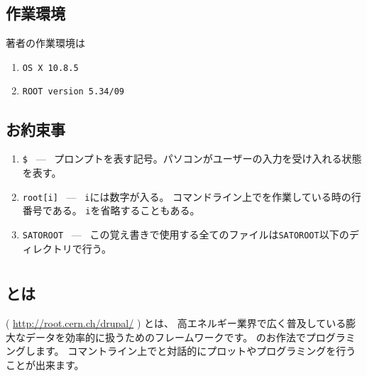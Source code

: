 \documentclass{jarticle}
\begin{document}
  \subsection{作業環境}
  著者の作業環境は
  \begin{enumerate}
   \item 
	 \verb|OS X 10.8.5|
   \item 
	 \verb|ROOT version 5.34/09|
  \end{enumerate}


  \subsection{お約束事}
  \begin{enumerate}
   \item \verb|$| \ --- \ プロンプトを表す記号。パソコンがユーザーの入力を受け入れる状態を表す。
   \item \verb|root[i]| \ --- \ \verb|i|には数字が入る。
	 コマンドライン上で\ROOT を作業している時の行番号である。
	 \verb|i|を省略することもある。
   \item \verb|SATOROOT| \ --- \ この覚え書きで使用する全てのファイルは\verb|SATOROOT|以下のディレクトリで行う。
  \end{enumerate}

  \clearpage
 \section{\ROOT}


  \subsection{\ROOT とは}
  \ROOT ( \url{http://root.cern.ch/drupal/} ) とは、
  高エネルギー業界で広く普及している膨大なデータを効率的に扱うためのフレームワークです。
  \Cpp のお作法でプログラミングします。
  コマントライン上で\ROOT と対話的にプロットやプログラミングを行うことが出来ます。
\end{document}
